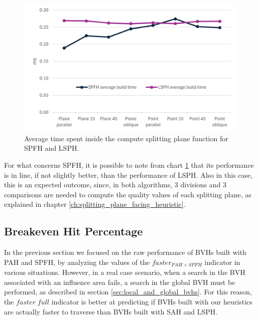 \documentclass{PoliMi_MasterThesis}
\begin{document}
\begin{figure}[H] 
	\includegraphics[width=\textwidth]{Images/spfh_build_time_chart.png}
	\caption{Average time spent inside the compute splitting plane function for SPFH and LSPH.}
	\label{fig:spfh_build_time_chart}
\end{figure}

For what concerns SPFH, it is possible to note from chart \ref{fig:spfh_build_time_chart} that its performance is in line, if not slightly better, than the performance of LSPH. Also in this case, this is an expected outcome, since, in both algorithms, 3 divisions and 3 comparisons are needed to compute the quality values of each splitting plane, as explained in chapter \ref{ch:splitting_plane_facing_heuristic}.

\subsection{Breakeven Hit Percentage} \label{ssec:breakeven_hit_percentage}
In the previous section we focused on the raw performance of BVHs built with PAH and SPFH, by analyzing the values of the $faster_{PAH+SPFH}$ indicator in various situations. However, in a real case scenario, when a search in the BVH associated with an influence area fails, a search in the global BVH must be performed, as described in section \ref{sec:local_and_global_bvhs}. For this reason, the $faster \; full$ indicator is better at predicting if BVHs built with our heuristics are actually faster to traverse than BVHs built with SAH and LSPH.
\end{document}
